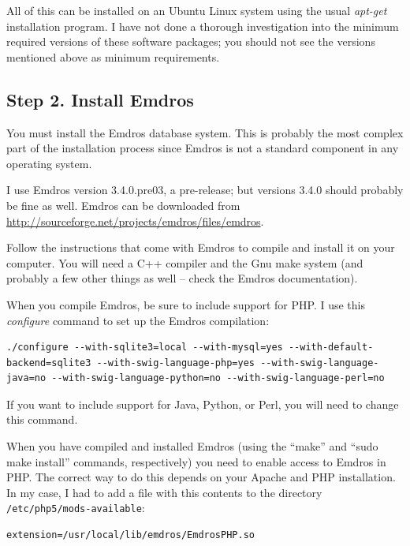 \documentclass[11pt,oneside,a4paper]{memoir}
\begin{document}
All of this can be installed on an Ubuntu Linux system using the usual \emph{apt-get} installation
program. I have not done a thorough investigation into the minimum required versions of these
software packages; you should not see the versions mentioned above as minimum requirements.


\subsection{Step 2. Install Emdros}\label{sec-install-emdros}

You must install the Emdros database system. This is probably the most complex part of
the installation process since Emdros is not a standard component in any operating system.

I use Emdros version 3.4.0.pre03, a pre-release; but versions 3.4.0 should probably be fine as well.
Emdros can be downloaded from \url{http://sourceforge.net/projects/emdros/files/emdros}.

Follow the instructions that come with Emdros to compile and install it on your computer. You will
need a C++ compiler and the Gnu make system (and
probably a few other things as well -- check the Emdros documentation).

When you compile Emdros, be sure to include support for PHP. I use this
\emph{configure} command to set up the Emdros compilation:

\begin{lstlisting}
./configure --with-sqlite3=local --with-mysql=yes --with-default-backend=sqlite3 --with-swig-language-php=yes --with-swig-language-java=no --with-swig-language-python=no --with-swig-language-perl=no
\end{lstlisting}

If you want to include support for Java, Python, or Perl, you
will need to change this command.

When you have compiled and installed Emdros (using the ``make'' and ``sudo make install'' commands,
respectively) you need to enable access to Emdros in PHP. The correct way to do this depends on your
Apache and PHP installation. In my case, I had to add a file with this contents to the
directory \texttt{/etc/php5/mods-available}:

\begin{lstlisting}
extension=/usr/local/lib/emdros/EmdrosPHP.so
\end{lstlisting}
\end{document}
